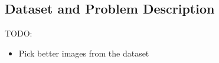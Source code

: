
\subsection{Dataset and Problem Description}

TODO:
\begin{itemize}
    \item Pick better images from the dataset
\end{itemize}

